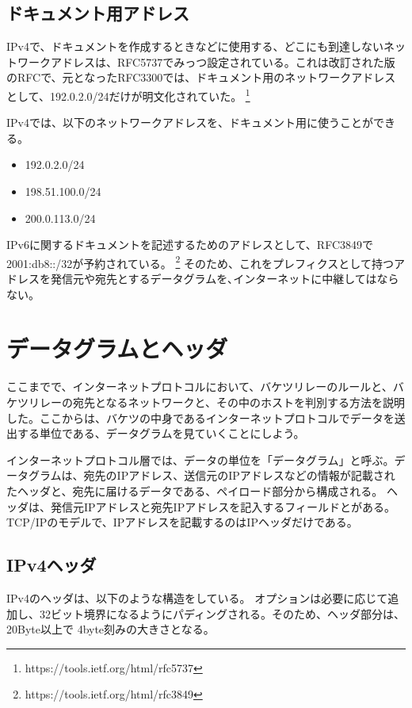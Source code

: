 \subsection{ドキュメント用アドレス}
IPv4で、ドキュメントを作成するときなどに使用する、どこにも到達しないネットワークアドレスは、RFC5737でみっつ設定されている。これは改訂された版のRFCで、元となったRFC3300では、ドキュメント用のネットワークアドレスとして、192.0.2.0/24だけが明文化されていた。
\footnote{https://tools.ietf.org/html/rfc5737}

IPv4では、以下のネットワークアドレスを、ドキュメント用に使うことができる。

\begin{itemize}
  \item 192.0.2.0/24
  \item 198.51.100.0/24
  \item 200.0.113.0/24
\end{itemize}

IPv6に関するドキュメントを記述するためのアドレスとして、RFC3849で2001:db8::/32が予約されている。
\footnote{https://tools.ietf.org/html/rfc3849}
そのため、これをプレフィクスとして持つアドレスを発信元や宛先とするデータグラムを､インターネットに中継してはならない。


\section{データグラムとヘッダ}

ここまでで、インターネットプロトコルにおいて、バケツリレーのルールと、バケツリレーの宛先となるネットワークと、その中のホストを判別する方法を説明した。ここからは、バケツの中身であるインターネットプロトコルでデータを送出する単位である、データグラムを見ていくことにしよう。

インターネットプロトコル層では、データの単位を「データグラム」と呼ぶ。データグラムは、宛先のIPアドレス、送信元のIPアドレスなどの情報が記載されたヘッダと、宛先に届けるデータである、ペイロード部分から構成される。
ヘッダは、発信元IPアドレスと宛先IPアドレスを記入するフィールドとがある。TCP/IPのモデルで、IPアドレスを記載するのはIPヘッダだけである。

\subsection{IPv4ヘッダ}
IPv4のヘッダは、以下のような構造をしている。
オプションは必要に応じて追加し、32ビット境界になるようにパディングされる。そのため、ヘッダ部分は、20Byte以上で 4byte刻みの大きさとなる。

